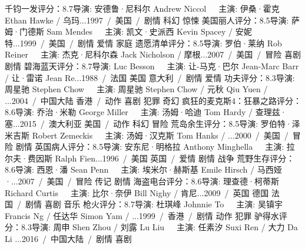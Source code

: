 千钧一发评分：8.7导演: 安德鲁·尼科尔 Andrew Niccol   主演: 伊桑·霍克 Ethan Hawke / 乌玛...1997 / 美国 / 剧情 科幻 惊悚
美国丽人评分：8.5导演: 萨姆·门德斯 Sam Mendes   主演: 凯文·史派西 Kevin Spacey / 安妮特...1999 / 美国 / 剧情 爱情 家庭
遗愿清单评分：8.5导演: 罗伯·莱纳 Rob Reiner   主演: 杰克·尼科尔森 Jack Nicholson / 摩根...2007 / 美国 / 冒险 喜剧 剧情
碧海蓝天评分：8.7导演: Luc Besson   主演: 让-马克·巴尔 Jean-Marc Barr / 让·雷诺 Jean Re...1988 / 法国 美国 意大利 / 剧情 爱情
功夫评分：8.3导演: 周星驰 Stephen Chow   主演: 周星驰 Stephen Chow / 元秋 Qiu Yuen / ...2004 / 中国大陆 香港 / 动作 喜剧 犯罪 奇幻
疯狂的麦克斯4：狂暴之路评分：8.6导演: 乔治·米勒 George Miller   主演: 汤姆·哈迪 Tom Hardy / 查理兹·塞...2015 / 澳大利亚 美国 / 动作 科幻 冒险
荒岛余生评分：8.5导演: 罗伯特·泽米吉斯 Robert Zemeckis   主演: 汤姆·汉克斯 Tom Hanks / ...2000 / 美国 / 冒险 剧情
英国病人评分：8.5导演: 安东尼·明格拉 Anthony Minghella   主演: 拉尔夫·费因斯 Ralph Fien...1996 / 美国 英国 / 爱情 剧情 战争
荒野生存评分：8.6导演: 西恩·潘 Sean Penn   主演: 埃米尔·赫斯基 Emile Hirsch / 马西娅·...2007 / 美国 / 冒险 传记 剧情
海盗电台评分：8.6导演: 理查德·柯蒂斯 Richard Curtis   主演: 比尔·奈伊 Bill Nighy / 肯尼...2009 / 英国 德国 法国 / 剧情 喜剧 音乐
枪火评分：8.7导演: 杜琪峰 Johnnie To   主演: 吴镇宇 Francis Ng / 任达华 Simon Yam / ...1999 / 香港 / 剧情 动作 犯罪
驴得水评分：8.3导演: 周申 Shen Zhou / 刘露 Lu Liu   主演: 任素汐 Suxi Ren / 大力 Da Li ...2016 / 中国大陆 / 剧情 喜剧
